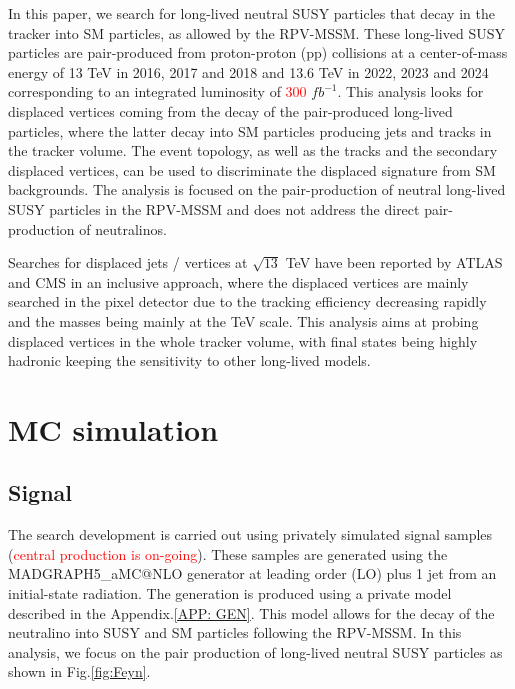 \documentclass{cernatlasnote}
\begin{document}
 In this paper, we search for long-lived neutral SUSY particles that decay in the tracker into SM particles, as allowed by the RPV-MSSM. These long-lived SUSY particles are pair-produced from proton-proton (pp) collisions at a center-of-mass energy of 13 TeV in 2016, 2017 and 2018 and 13.6 TeV in 2022, 2023 and 2024 corresponding to an integrated luminosity of \textcolor{red}{300} $fb^{-1}$. This analysis looks for displaced vertices coming from the decay of the pair-produced long-lived particles, where the latter decay into SM particles producing jets and tracks in the tracker volume. The event topology, as well as the tracks and the secondary displaced vertices, can be used to discriminate the displaced signature from SM backgrounds. The analysis is focused on the pair-production of neutral long-lived SUSY particles in the RPV-MSSM and does not address the direct pair-production of neutralinos.

 Searches for displaced jets / vertices at $\sqrt{13}$ TeV have been reported by ATLAS \cite{ATLAS-CONF-2018-003} \cite{DISJETSATLAS} and CMS \cite{DISJETSCMS} in an inclusive approach, where the displaced vertices are mainly searched in the pixel detector due to the tracking efficiency decreasing rapidly and the masses being mainly at the TeV scale. This analysis aims at probing displaced vertices in the whole tracker volume, with final states being highly hadronic keeping the sensitivity to other long-lived models.


\newpage
\section{MC simulation}
\label{SEC: MC}

\subsection{Signal}
The search development is carried out using privately simulated signal samples (\textcolor{red}{central production is on-going}). These samples are generated using the MADGRAPH5\_aMC@NLO generator \cite{MAD} at leading order (LO) plus 1 jet from an initial-state radiation. The generation is produced using a private model described in the Appendix.\ref{APP: GEN}. This model allows for the decay of the neutralino into SUSY and SM particles following the RPV-MSSM. In this analysis, we focus on the pair production of long-lived neutral SUSY particles as shown in Fig.\ref{fig:Feyn}.
\end{document}
